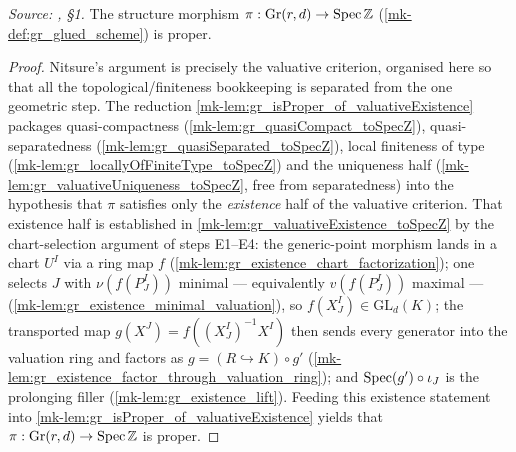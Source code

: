 \begin{lemma}\label{mk-lem:gr_proper}
  \leanok

  \textit{Source: \cite{nitsure-hilbert-quot}, \S 1.}
  The structure morphism \(\pi : \mathrm{Gr}(r,d) \to \operatorname{Spec} \mathbb{Z}\)
  (\ref{mk-def:gr_glued_scheme}) is proper.
\end{lemma}
\begin{proof}
  \leanok
  Nitsure's argument is precisely the valuative criterion, organised here so that
  all the topological/finiteness bookkeeping is separated from the one geometric
  step. The reduction \ref{mk-lem:gr_isProper_of_valuativeExistence} packages
  quasi-compactness (\ref{mk-lem:gr_quasiCompact_toSpecZ}), quasi-separatedness
  (\ref{mk-lem:gr_quasiSeparated_toSpecZ}), local finiteness of type
  (\ref{mk-lem:gr_locallyOfFiniteType_toSpecZ}) and the uniqueness half
  (\ref{mk-lem:gr_valuativeUniqueness_toSpecZ}, free from separatedness) into the
  hypothesis that \(\pi\) satisfies only the \emph{existence} half of the valuative
  criterion. That existence half is established in
  \ref{mk-lem:gr_valuativeExistence_toSpecZ} by the chart-selection argument of steps
  E1--E4: the generic-point morphism lands in a chart \(U^I\) via a ring map \(f\)
  (\ref{mk-lem:gr_existence_chart_factorization}); one selects \(J\) with
  \(\nu(f(P^I_J))\) minimal --- equivalently \(v(f(P^I_J))\) maximal ---
  (\ref{mk-lem:gr_existence_minimal_valuation}), so \(f(X^I_J) \in \mathrm{GL}_d(K)\);
  the transported map \(g(X^J) = f((X^I_J)^{-1} X^I)\) then sends every generator
  into the valuation ring and factors as \(g = (R \hookrightarrow K)\circ g'\)
  (\ref{mk-lem:gr_existence_factor_through_valuation_ring}); and \(\operatorname{Spec}(g') \circ
  \iota_J\) is the prolonging filler (\ref{mk-lem:gr_existence_lift}). Feeding this
  existence statement into \ref{mk-lem:gr_isProper_of_valuativeExistence} yields that
  \(\pi : \mathrm{Gr}(r,d) \to \operatorname{Spec} \mathbb{Z}\) is proper.
\end{proof}
